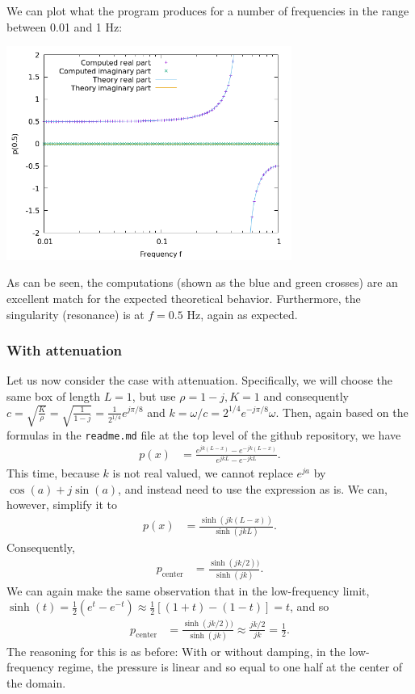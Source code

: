 \documentclass{article}
\begin{document}
We can plot what the program produces for a number of frequencies in
the range between 0.01 and 1 Hz:
%
%

\begin{center}
\includegraphics[width=0.7\textwidth]{no-attenuation/pressure-at-center.png}
\end{center}

As can be seen, the computations (shown as the blue and green crosses) are an
excellent match for the expected theoretical behavior. Furthermore,
the singularity (resonance) is at $f=0.5$ Hz, again as expected.


\subsubsection*{With attenuation}

Let us now consider the case with attenuation. Specifically, we will
choose the same box of length $L=1$, but use $\rho=1-j, K=1$ and
consequently $c=\sqrt{\frac{K}{\rho}}=\sqrt{\frac{1}{1-j}}=\frac{1}{2^{1/4}}e^{j\pi/8}$ 
and $k=\omega/c=2^{1/4}e^{-j\pi/8} \omega$. Then, again based
on the formulas in the \texttt{readme.md} file at the top level of the
github repository, we have
\begin{align*}
  p(x)
  &=
  \frac{e^{jk(L-x)} - e^{-jk(L-x)}}{e^{jkL} - e^{-jkL}}.
\end{align*}
This time, because $k$ is not real valued, we cannot replace $e^{ja}$
by $\cos(a)+j\sin(a)$, and instead need to use the expression as
is. We can, however, simplify it to
\begin{align*}
  p(x)
  &=
  \frac{\sinh(jk(L-x))}{\sinh(jkL)}.
\end{align*}
Consequently,
\begin{align*}
  p_\text{center}
  &=
  \frac{\sinh(jk/2))}{\sinh(jk)}.
\end{align*}
We can again make the same observation that in the low-frequency
limit, $\sinh(t)=\frac 12(e^t-e^{-t})\approx \frac 12[(1+t)-(1-t)]=t$,
and so
\begin{align*}
  p_\text{center}
  &=
  \frac{\sinh(jk/2))}{\sinh(jk)}
  \approx
  \frac{jk/2}{jk}
  = \frac 12.
\end{align*}
The reasoning for this is as before: With or without damping, in the
low-frequency regime, the pressure is linear and so equal to one half
at the center of the domain.
\end{document}
